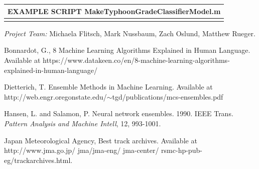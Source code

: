 \documentclass{SBCbookchapter}
\begin{document}
	
	\begin{table}[!htpb]
		\begin{tabular}{|l|}
			\multicolumn{1}{l}{{EXAMPLE SCRIPT} {\tiny MakeTyphoonGradeClassifierModel.m} }\\\hline
			\parbox[b]{5.9in}{}\\\hline
		\end{tabular}
	\end{table}
	
	
	
	\emph{Project Team:} Michaela Flitsch, Mark Nussbaum, Zach Oslund, Matthew Rueger.
	
	\newpage
	\begin{thebibliography}{9}
		
		  {Bonnardot, G.}, 8 Machine Learning Algorithms Explained in Human Language. Available at https://www.datakeen.co/en/8-machine-learning-algorithms-explained-in-human-language/
		
		 {Dietterich, T.} Ensemble Methods in Machine Learning.  Available at http://web.engr.oregonstate.edu/$\sim$tgd/publications/mcs-ensembles.pdf
		
		 {Hansen, L. and Salamon, P.} Neural network ensembles. 1990. IEEE Trans. \emph{Pattern Analysis and Machine Intell}, 12, 993-1001.
		
		 {Japan Meteorological Agency},  Best track archives. Available at  http://www.jma.go.jp/ jma/jma-eng/ jma-center/ rsmc-hp-pub-eg/trackarchives.html.
		
	\end{thebibliography}
\end{document}

